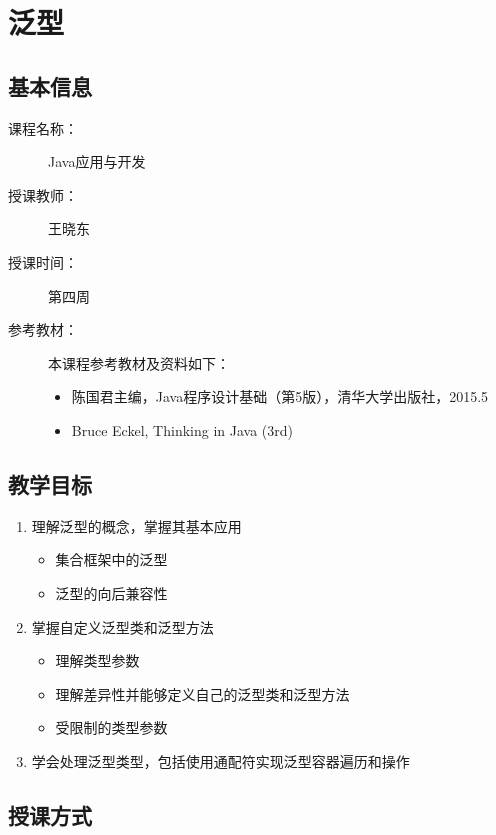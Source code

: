 \chapter{泛型}
\label{chp:Java-generic-type}

\section*{基本信息}
\sline
\begin{description}
\item[课程名称：] Java应用与开发
\item[授课教师：] 王晓东
\item[授课时间：] 第四周
\item[参考教材：] 本课程参考教材及资料如下：
  \begin{itemize}
  \item 陈国君主编，Java程序设计基础（第5版），清华大学出版社，2015.5
  \item Bruce Eckel, Thinking in Java (3rd)
  \end{itemize}
\end{description}

\section*{教学目标}

\sline

\begin{enumerate}
\item 理解泛型的概念，掌握其基本应用
  \begin{itemize}
  \item 集合框架中的泛型
  \item 泛型的向后兼容性
  \end{itemize}
\item 掌握自定义泛型类和泛型方法
  \begin{itemize}
  \item 理解类型参数
  \item 理解差异性并能够定义自己的泛型类和泛型方法
  \item 受限制的类型参数
  \end{itemize}
\item 学会处理泛型类型，包括使用通配符实现泛型容器遍历和操作
\end{enumerate}

\section*{授课方式}

